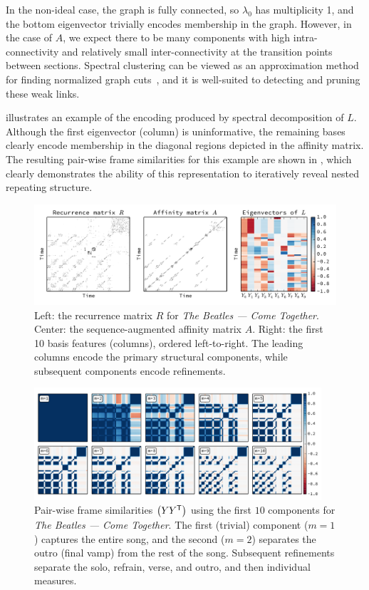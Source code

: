 \documentclass{article}
\begin{document}
In the non-ideal case, the graph is fully connected, so $\lambda_0$ has multiplicity 1, 
and the bottom eigenvector trivially encodes membership in the graph. 
However, in the case of $A$, we expect there to be many components
with high intra-connectivity and relatively small inter-connectivity at the
transition points between sections.  Spectral clustering can be viewed as an approximation 
method for finding normalized graph cuts~\cite{von2007tutorial}, and it is well-suited to detecting and pruning these weak links.

 illustrates an example of the encoding produced by spectral
decomposition of $L$.  Although the first eigenvector (column) is uninformative, 
the remaining bases clearly encode membership in the diagonal regions depicted in the 
affinity matrix.  
The resulting pair-wise frame similarities for this example are shown in , 
which clearly demonstrates the ability of this representation to iteratively reveal 
nested repeating structure.

\begin{figure}[t]
\centering
\includegraphics[width=\textwidth]{figs/recurrence}
\caption{Left: the recurrence matrix $R$ for \emph{The Beatles --- Come
Together}. Center: the sequence-augmented affinity matrix $A$.
Right: the first 10 basis features (columns), ordered left-to-right.  
The leading columns encode the primary structural components, while subsequent
components encode refinements.\label{recurrence}}
\end{figure}

 
\begin{figure}[t]
\centering
\includegraphics[width=0.95\textwidth]{figs/lowrank}
\caption{Pair-wise frame similarities $\left(YY^\mathsf{T}\right)$ using the first $10$ components for \emph{The Beatles --- Come Together}.  The first
(trivial) component ($m=1$) captures the entire song, and the second ($m=2$) separates
the outro (final vamp) from the rest of the song.  
Subsequent refinements separate the solo, refrain, verse, and outro, and then individual measures.\label{lowrank}}
\end{figure}
\end{document}
